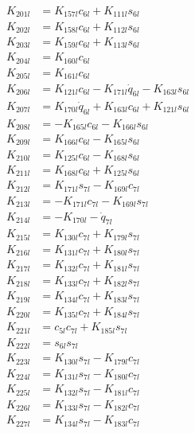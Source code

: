 \begin{multicols}{2}
\begin{align}
K_{201l} &= K_{157l}c_{6l} + K_{111l}s_{6l} \nonumber \\
K_{202l} &= K_{158l}c_{6l} + K_{112l}s_{6l} \nonumber \\
K_{203l} &= K_{159l}c_{6l} + K_{113l}s_{6l} \nonumber \\
K_{204l} &= K_{160l}c_{6l} \nonumber \\
K_{205l} &= K_{161l}c_{6l} \nonumber \\
K_{206l} &= K_{121l}c_{6l} - K_{171l}\dot{q}_{6l} - K_{163l}s_{6l} \nonumber \\
K_{207l} &= K_{170l}\dot{q}_{6l} + K_{163l}c_{6l} + K_{121l}s_{6l} \nonumber \\
K_{208l} &= - K_{165l}c_{6l} - K_{166l}s_{6l} \nonumber \\
K_{209l} &= K_{166l}c_{6l} - K_{165l}s_{6l} \nonumber \\
K_{210l} &= K_{125l}c_{6l} - K_{168l}s_{6l} \nonumber \\
K_{211l} &= K_{168l}c_{6l} + K_{125l}s_{6l} \nonumber \\
K_{212l} &= K_{171l}s_{7l} - K_{169l}c_{7l} \nonumber \\
K_{213l} &= - K_{171l}c_{7l} - K_{169l}s_{7l} \nonumber \\
K_{214l} &= - K_{170l} - \dot{q}_{7l} \nonumber \\
K_{215l} &= K_{130l}c_{7l} + K_{179l}s_{7l} \nonumber \\
K_{216l} &= K_{131l}c_{7l} + K_{180l}s_{7l} \nonumber \\
K_{217l} &= K_{132l}c_{7l} + K_{181l}s_{7l} \nonumber \\
K_{218l} &= K_{133l}c_{7l} + K_{182l}s_{7l} \nonumber \\
K_{219l} &= K_{134l}c_{7l} + K_{183l}s_{7l} \nonumber \\
K_{220l} &= K_{135l}c_{7l} + K_{184l}s_{7l} \nonumber \\
K_{221l} &= c_{5l}c_{7l} + K_{185l}s_{7l} \nonumber \\
K_{222l} &= s_{6l}s_{7l} \nonumber \\
K_{223l} &= K_{130l}s_{7l} - K_{179l}c_{7l} \nonumber \\
K_{224l} &= K_{131l}s_{7l} - K_{180l}c_{7l} \nonumber \\
K_{225l} &= K_{132l}s_{7l} - K_{181l}c_{7l} \nonumber \\
K_{226l} &= K_{133l}s_{7l} - K_{182l}c_{7l} \nonumber \\
K_{227l} &= K_{134l}s_{7l} - K_{183l}c_{7l} \nonumber \\

\end{align}
\end{multicols}
